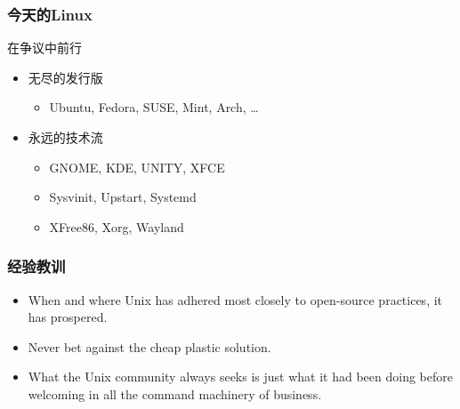 \documentclass[compress]{beamer}
\begin{document}
\begin{frame}
  \frametitle{今天的Linux}
\begin{block}{在争议中前行}
\begin{itemize}
\item 无尽的发行版
    \begin{itemize}
        \item Ubuntu, Fedora, SUSE, Mint, Arch, \ldots
    \end{itemize}
\item 永远的技术流
    \begin{itemize}
        \item GNOME, KDE, UNITY, XFCE
        \item Sysvinit, Upstart, Systemd
        \item XFree86, Xorg, Wayland
    \end{itemize}
\end{itemize}
\end{block}


\end{frame}

\begin{frame}
\frametitle{经验教训}
\begin{itemize}
\item When and where Unix has adhered most closely to open-source practices, it has prospered.
\item Never bet against the cheap plastic solution.
\item What the Unix community always seeks is just what it had  been doing before welcoming in all the command machinery of
business.
\end{itemize}
\end{frame}

\begin{frame}
\footnotesize

\nocite{*}
\end{frame}
\end{document}
